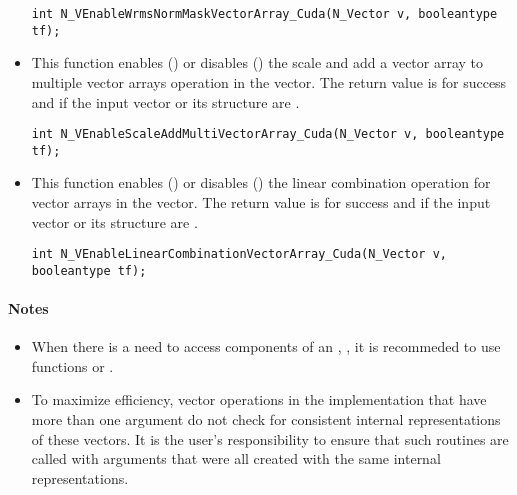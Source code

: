 \begin{itemize}
\verb|int N_VEnableWrmsNormMaskVectorArray_Cuda(N_Vector v, booleantype tf);|


\item {}

This function enables () or disables () the scale and
add a vector array to multiple vector arrays operation in the {\cuda} vector. The
return value is  for success and  if the input vector or its
 structure are .

\verb|int N_VEnableScaleAddMultiVectorArray_Cuda(N_Vector v, booleantype tf);|


\item {}

This function enables () or disables () the linear
combination operation for vector arrays in the {\cuda} vector. The return value
is  for success and  if the input vector or its  structure
are .

\verb|int N_VEnableLinearCombinationVectorArray_Cuda(N_Vector v, booleantype tf);|

\end{itemize}
\paragraph{\bf Notes}

\begin{itemize}

\item
  When there is a need to access components of an , ,
  it is recommeded to use functions  or
  .


\item
  {\warn}To maximize efficiency, vector operations in the {\nveccuda} implementation
  that have more than one  argument do not check for
  consistent internal representations of these vectors. It is the user's
  responsibility to ensure that such routines are called with 
  arguments that were all created with the same internal representations.

\end{itemize}

